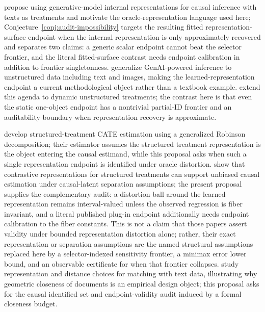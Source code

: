 \documentclass[11pt]{article}
\theoremstyle{definition}
\theoremstyle{plain}
\theoremstyle{remark}
\begin{document}
\citet{ImaiNakamura2024TextTreatments} propose using generative-model internal representations for causal inference with texts as treatments and motivate the oracle-representation language used here; Conjecture~\ref{conj:audit-impossibility} targets the resulting fitted representation-surface endpoint when the internal representation is only approximately recovered and separates two claims: a generic scalar endpoint cannot beat the selector frontier, and the literal fitted-surface contrast needs endpoint calibration in addition to frontier singletonness.  \citet{ImaiNakamura2025GPI} generalize GenAI-powered inference to unstructured data including text and images, making the learned-representation endpoint a current methodological object rather than a textbook example.  \citet{ImaiNakamura2026Dynamic} extend this agenda to dynamic unstructured treatments; the contrast here is that even the static one-object endpoint has a nontrivial partial-ID frontier and an auditability boundary when representation recovery is approximate.

\citet{KaddourZhuLiuKusnerSilva2021} develop structured-treatment CATE estimation using a generalized Robinson decomposition; their estimator assumes the structured treatment representation is the object entering the causal estimand, while this proposal asks when such a single representation endpoint is identified under oracle distortion.  \citet{CorcollAndreuVlontzosORiordanGilliganLee2026} show that contrastive representations for structured treatments can support unbiased causal estimation under causal-latent separation assumptions; the present proposal supplies the complementary audit: a distortion ball around the learned representation remains interval-valued unless the observed regression is fiber invariant, and a literal published plug-in endpoint additionally needs endpoint calibration to the fiber constants.  This is not a claim that those papers assert validity under bounded representation distortion alone; rather, their exact representation or separation assumptions are the named structural assumptions replaced here by a selector-indexed sensitivity frontier, a minimax error lower bound, and an observable certificate for when that frontier collapses.  \citet{MozerMiratrixKaufmanAnastasopoulos2020} study representation and distance choices for matching with text data, illustrating why geometric closeness of documents is an empirical design object; this proposal asks for the causal identified set and endpoint-validity audit induced by a formal closeness budget.
\end{document}

